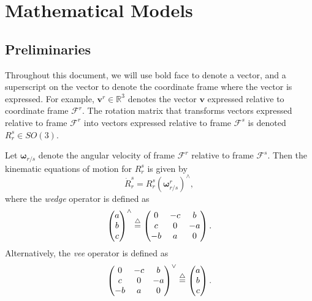 \section{Mathematical Models}

\subsection{Preliminaries}

Throughout this document, we will use bold face to denote a vector, and a superscript on the vector to denote the coordinate frame where the vector is expressed.  For example, $\mathbf{v}^r\in\mathbb{R}^3$ denotes the vector $\mathbf{v}$ expressed relative to coordinate frame $\mathcal{F}^r$.  The rotation matrix that transforms vectors expressed relative to frame $\mathcal{F}^r$ into vectors expressed relative to frame $\mathcal{F}^s$ is denoted $R_r^s\in SO(3)$.  

Let $\boldsymbol{\omega}_{r/s}$ denote the angular velocity of frame $\mathcal{F}^r$ relative to frame $\mathcal{F}^s$.  Then the kinematic equations of motion for $R_r^s$ is given by
\begin{equation}\label{eq:R_r^s}
\dot{R}_r^s = R_r^s(\boldsymbol{\omega}_{r/s}^r)^\wedge,
\end{equation}
where the {\em wedge} operator is defined as
\[
\begin{pmatrix}a \\ b \\ c\end{pmatrix}^\wedge \stackrel{\triangle}{=} \begin{pmatrix} 0 & -c & b \\ c & 0 & -a \\ -b & a & 0 \end{pmatrix}. 
\]
Alternatively, the {\em vee} operator is defined as
\[
\begin{pmatrix} 0 & -c & b \\ c & 0 & -a \\ -b & a & 0 \end{pmatrix}^\vee \stackrel{\triangle}{=} \begin{pmatrix}a \\ b \\ c\end{pmatrix}. 
\]

